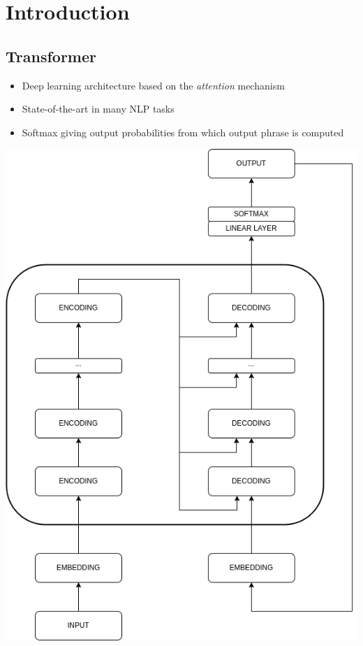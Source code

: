 \documentclass[landscape]{article}
\begin{document}

\cp
\section*{Introduction}
\vspace*{10mm}
\subsection*{Transformer}
\vspace*{-12mm}
\begin{itemize}\itemsep=7mm
	\item Deep learning architecture based on the \textit{attention} mechanism
	\item State-of-the-art in many NLP tasks
    \item Softmax giving output probabilities from which output phrase is computed 
\end{itemize}
\endminipage\hfill
{}
\vspace{4mm}
\centering
\includegraphics[scale=0.5]{../memoria/resources/transformer.png}
\endminipage\hfill
\end{document}
